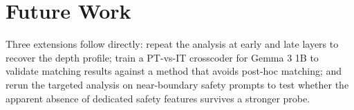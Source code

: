 \pagestyle{fancy}

\section{Future Work}
\label{sec:future-work}

Three extensions follow directly: repeat the analysis at early and late layers to recover the depth profile; train a PT-vs-IT crosscoder for Gemma 3 1B to validate matching results against a method that avoids post-hoc matching; and rerun the targeted analysis on near-boundary safety prompts to test whether the apparent absence of dedicated safety features survives a stronger probe.
